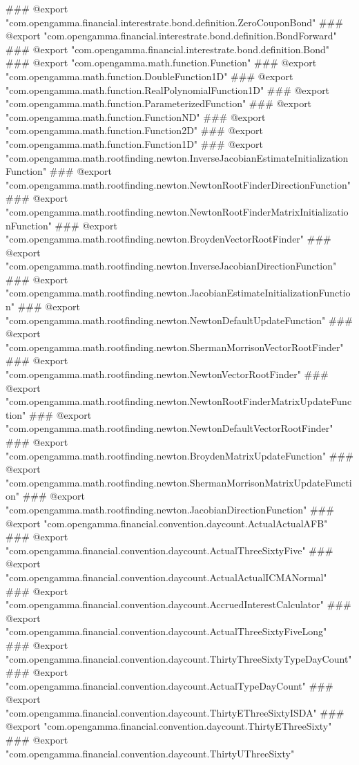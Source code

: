 ### @export "com.opengamma.financial.interestrate.bond.definition.ZeroCouponBond"
### @export "com.opengamma.financial.interestrate.bond.definition.BondForward"
### @export "com.opengamma.financial.interestrate.bond.definition.Bond"
### @export "com.opengamma.math.function.Function"
### @export "com.opengamma.math.function.DoubleFunction1D"
### @export "com.opengamma.math.function.RealPolynomialFunction1D"
### @export "com.opengamma.math.function.ParameterizedFunction"
### @export "com.opengamma.math.function.FunctionND"
### @export "com.opengamma.math.function.Function2D"
### @export "com.opengamma.math.function.Function1D"
### @export "com.opengamma.math.rootfinding.newton.InverseJacobianEstimateInitializationFunction"
### @export "com.opengamma.math.rootfinding.newton.NewtonRootFinderDirectionFunction"
### @export "com.opengamma.math.rootfinding.newton.NewtonRootFinderMatrixInitializationFunction"
### @export "com.opengamma.math.rootfinding.newton.BroydenVectorRootFinder"
### @export "com.opengamma.math.rootfinding.newton.InverseJacobianDirectionFunction"
### @export "com.opengamma.math.rootfinding.newton.JacobianEstimateInitializationFunction"
### @export "com.opengamma.math.rootfinding.newton.NewtonDefaultUpdateFunction"
### @export "com.opengamma.math.rootfinding.newton.ShermanMorrisonVectorRootFinder"
### @export "com.opengamma.math.rootfinding.newton.NewtonVectorRootFinder"
### @export "com.opengamma.math.rootfinding.newton.NewtonRootFinderMatrixUpdateFunction"
### @export "com.opengamma.math.rootfinding.newton.NewtonDefaultVectorRootFinder"
### @export "com.opengamma.math.rootfinding.newton.BroydenMatrixUpdateFunction"
### @export "com.opengamma.math.rootfinding.newton.ShermanMorrisonMatrixUpdateFunction"
### @export "com.opengamma.math.rootfinding.newton.JacobianDirectionFunction"
### @export "com.opengamma.financial.convention.daycount.ActualActualAFB"
### @export "com.opengamma.financial.convention.daycount.ActualThreeSixtyFive"
### @export "com.opengamma.financial.convention.daycount.ActualActualICMANormal"
### @export "com.opengamma.financial.convention.daycount.AccruedInterestCalculator"
### @export "com.opengamma.financial.convention.daycount.ActualThreeSixtyFiveLong"
### @export "com.opengamma.financial.convention.daycount.ThirtyThreeSixtyTypeDayCount"
### @export "com.opengamma.financial.convention.daycount.ActualTypeDayCount"
### @export "com.opengamma.financial.convention.daycount.ThirtyEThreeSixtyISDA"
### @export "com.opengamma.financial.convention.daycount.ThirtyEThreeSixty"
### @export "com.opengamma.financial.convention.daycount.ThirtyUThreeSixty"

